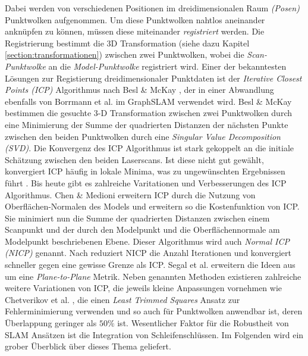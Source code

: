 Dabei werden von verschiedenen Positionen im dreidimensionalen Raum \emph{(Posen)} Punktwolken aufgenommen. Um diese Punktwolken nahtlos aneinander anknüpfen zu können, müssen diese miteinander \emph{registriert} werden. Die Registrierung bestimmt die 3D Transformation (siehe dazu Kapitel \ref{section:transformationen}) zwischen zwei Punktwolken, wobei die \emph{Scan-Punktwolke} an die \emph{Model-Punktwolke} registriert wird.
Einer der bekanntesten Lösungen zur Registierung dreidimensionaler Punktdaten ist der \emph{Iterative Closest Points (ICP)} Algorithmus nach Besl \& McKay \cite{besl1992method}, der in einer Abwandlung ebenfalls von Borrmann et al. im GraphSLAM \cite{borrmann2008globally} verwendet wird.
Besl \& McKay \cite{besl1992method} bestimmen die gesuchte 3-D Transformation zwischen zwei Punktwolken durch eine Minimierung der Summe der quadrierten Distanzen der nächsten Punkte zwischen den beiden Punktwolken durch eine \emph{Singular Value Decomposition (SVD)}.
Die Konvergenz des ICP Algorithmus ist stark gekoppelt an die initiale Schätzung zwischen den beiden Laserscans. Ist diese nicht gut gewählt, konvergiert ICP häufig in lokale Minima, was zu ungewünschten Ergebnissen führt \cite{he2017iterative}. 
Bis heute gibt es zahlreiche Varitationen und Verbesserungen des ICP Algorithmus.
Chen \& Medioni \cite{chen1992object} erweitern ICP durch die Nutzung von Oberflächen-Normalen des Models und erweitern so die Kostenfunktion von ICP. Sie minimiert nun die Summe der quadrierten Distanzen zwischen einem Scanpunkt und der durch den Modelpunkt und die Oberflächennormale am Modelpunkt beschriebenen Ebene. Dieser Algorithmus wird auch \emph{Normal ICP (NICP)} genannt. 
Nach \cite{he2017iterative} reduziert NICP die Anzahl Iterationen und konvergiert schneller  gegen eine gewisse Grenze als ICP.
Segal et al. \cite{segal2009generalized} erweitern die Ideen aus \cite{chen1992object} um eine \emph{Plane-to-Plane} Metrik.
Neben genannten Methoden existieren zahlreiche weitere Variationen von ICP, die jeweils kleine Anpassungen vornehmen wie Chetverikov et al. \cite{chetverikov2005robust}, die einen \emph{Least Trimmed Squares} Ansatz zur Fehlerminimierung verwenden und so auch für Punktwolken anwendbar ist, deren Überlappung geringer als $50\%$ ist.
Wesentlicher Faktor für die Robustheit von SLAM Ansätzen ist die Integration von Schleifenschlüssen. Im Folgenden wird ein grober Überblick über dieses Thema geliefert.





